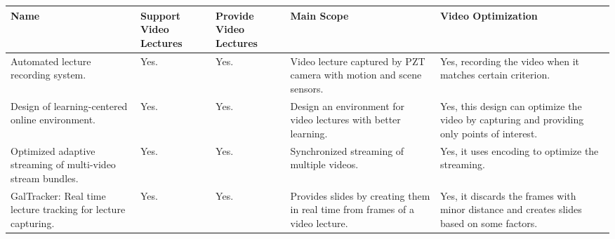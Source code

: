 \begin{sideways}
\centering
\begin{tabularx}{1.5\textwidth} { 
  | >{\raggedright\arraybackslash}X 
  | >{\centering\arraybackslash}X | >{\centering\arraybackslash}X | >{\centering\arraybackslash}X | >{\raggedleft\arraybackslash}X | }
 \hline
\bfseries{Name} & \bfseries{Support Video Lectures} &\bfseries{Provide Video Lectures} &\bfseries{Main Scope} & \bfseries{Video Optimization}  \\
\hline
Automated lecture recording system.\cite{Chou2010}
& Yes.
& Yes.
& Video lecture captured by PZT camera with motion and scene sensors.
& Yes, recording the video when it matches certain criterion.
\\
\hline
Design of learning-centered online environment.\cite{Garcia-Cabrero2018}
& Yes.
& Yes.
& Design an environment for video lectures with better learning.
& Yes, this design can optimize the video by capturing and providing only points of interest.
\\
\hline
Optimized adaptive streaming of multi-video stream bundles.\cite{Carlsson2017}
& Yes.
& Yes.
& Synchronized streaming of multiple videos.
& Yes, it uses encoding to optimize the streaming.
\\

\hline
GalTracker: Real time lecture tracking for lecture capturing.\cite{Gonzalez-Agulla2013}
& Yes.
& Yes.
& Provides slides by creating them in real time from frames of a video lecture.
& Yes, it discards the frames with minor distance and creates slides based on some factors.
\\
\hline

\end{tabularx}
\end{sideways}



